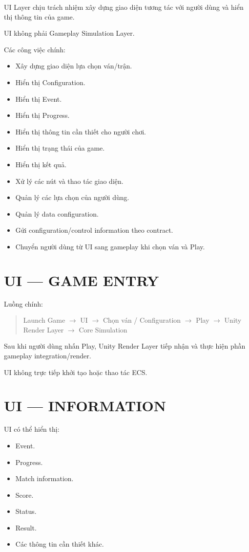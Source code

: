 \documentclass[12pt,a4paper]{article}
\newcommand{\flow}[1]{%
  \begin{quote}\centering\ttfamily #1\end{quote}%
}
\begin{document}
UI Layer chịu trách nhiệm xây dựng giao diện tương tác với người dùng và hiển thị thông tin của game.

UI không phải Gameplay Simulation Layer.

Các công việc chính:
\begin{itemize}[nosep]
  \item Xây dựng giao diện lựa chọn ván/trận.
  \item Hiển thị Configuration.
  \item Hiển thị Event.
  \item Hiển thị Progress.
  \item Hiển thị thông tin cần thiết cho người chơi.
  \item Hiển thị trạng thái của game.
  \item Hiển thị kết quả.
  \item Xử lý các nút và thao tác giao diện.
  \item Quản lý các lựa chọn của người dùng.
  \item Quản lý data configuration.
  \item Gửi configuration/control information theo contract.
  \item Chuyển người dùng từ UI sang gameplay khi chọn ván và Play.
\end{itemize}

\section{UI --- GAME ENTRY}

Luồng chính:

\flow{Launch Game $\rightarrow$ UI $\rightarrow$ Chọn ván / Configuration $\rightarrow$ Play $\rightarrow$ Unity Render Layer $\rightarrow$ Core Simulation}

Sau khi người dùng nhấn Play, Unity Render Layer tiếp nhận và thực hiện phần gameplay integration/render.

UI không trực tiếp khởi tạo hoặc thao tác ECS.

\section{UI --- INFORMATION}

UI có thể hiển thị:
\begin{itemize}[nosep]
  \item Event.
  \item Progress.
  \item Match information.
  \item Score.
  \item Status.
  \item Result.
  \item Các thông tin cần thiết khác.
\end{itemize}
\end{document}
